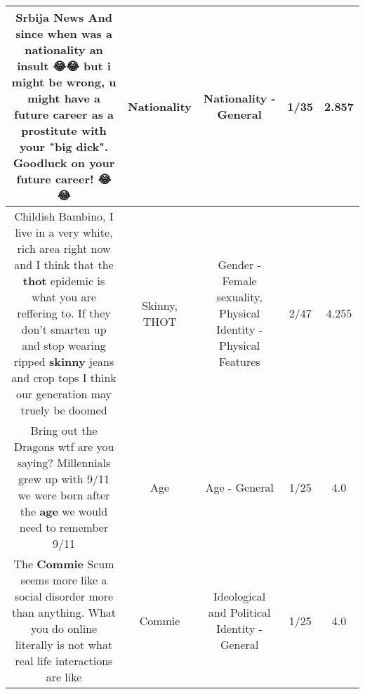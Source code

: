 \documentclass[11pt]{article}
\newlength\mylength
\begin{document}
\begin{center}
\begin{longtable}{|C{.65\mylength}|C{.30\mylength}|C{.12\mylength}|C{.12\mylength}|C{.12\mylength}|}
  \small Srbija News And since when was a \textbf{nationality} an insult 😂😂 but i might be wrong, u might have a future career as a prostitute with your "big dick". Goodluck on your future career! 😂😂\normalsize   & Nationality & Nationality - General & 1/35 & 2.857 \\  \hline
  \small Childish Bambino, I live in a very white, rich area right now and I think that the \textbf{thot} epidemic is what you are reffering to. If they don't smarten up and stop wearing ripped \textbf{skinny} jeans and crop tops I think our generation may truely be doomed\normalsize   & Skinny, THOT & Gender - Female sexuality, Physical Identity - Physical Features & 2/47 & 4.255 \\  \hline
  \small Bring out the Dragons wtf are you saying? Millennials grew up with 9/11 we were born after the \textbf{age} we would need to remember 9/11\normalsize   & Age & Age - General & 1/25 & 4.0 \\  \hline
  \small The \textbf{Commie} Scum seems more like a social disorder more than anything. What you do online literally is not what real life interactions are like\normalsize   & Commie &  Ideological and Political Identity - General & 1/25 & 4.0 \\  \hline

\end{longtable}
\end{center}
\end{document}
